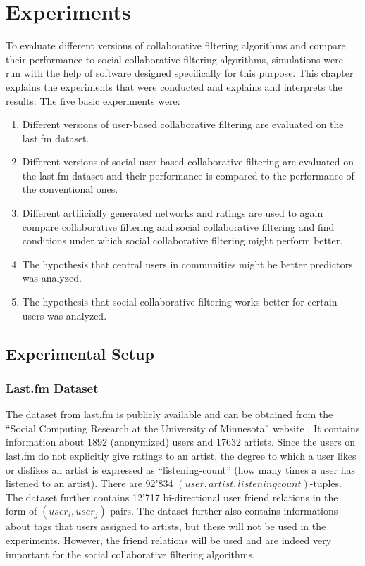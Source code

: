 \chapter{Experiments}
\label{c:experiments} To evaluate different versions of collaborative filtering algorithms and compare their performance to social collaborative filtering algorithms, simulations were run with the help of software designed specifically for this purpose. This chapter explains the experiments that were conducted and explains and interprets the results. The five basic experiments were:

\begin{enumerate}
\item Different versions of user-based collaborative filtering are evaluated on the last.fm dataset.
\item Different versions of social user-based collaborative filtering are evaluated on the last.fm dataset and their performance is compared to the performance of the conventional ones.
\item Different artificially generated networks and ratings are used to again compare collaborative filtering and social collaborative filtering and find conditions under which social collaborative filtering might perform better.
\item The hypothesis that central users in communities might be better predictors was analyzed.
\item The hypothesis that social collaborative filtering works better for certain users was analyzed.
\end{enumerate}

\section{Experimental Setup}
\label{st:experimentalsetup}

\subsection{Last.fm Dataset}
\label{sst:lastfmdataset} The dataset from last.fm is publicly available and can be obtained from the ``Social Computing Research at the University of Minnesota'' website \cite{Grouplens}. It contains information about 1892 (anonymized) users and 17632 artists. Since the users on last.fm do not explicitly give ratings to an artist, the degree to which a user likes or dislikes an artist is expressed as ``listening-count'' (how many times a user has listened to an artist). There are 92'834 $(user, artist, listeningcount)$-tuples. The dataset further contains 12'717 bi-directional user friend relations in the form of $(user_i, user_j)$-pairs. The dataset further also contains informations about tags that users assigned to artists, but these will not be used in the experiments. However, the friend relations will be used and are indeed very important for the social collaborative filtering algorithms.

